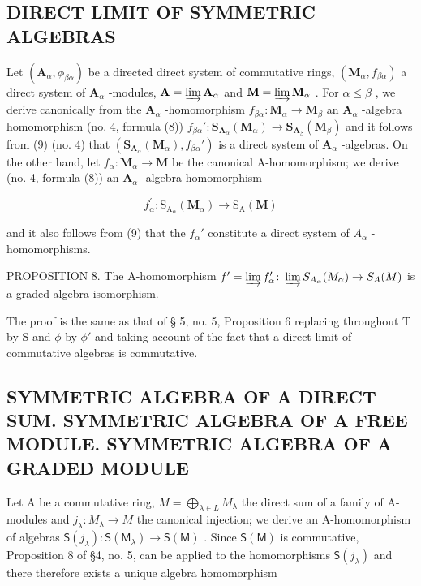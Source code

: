 \subsection{DIRECT LIMIT OF SYMMETRIC ALGEBRAS}

Let \((\mathbf{A}_{\alpha},\phi_{\beta \alpha})\) be a directed direct system of commutative rings, \((\mathbf{M}_{\alpha},f_{\beta \alpha})\) a direct system of \(\mathbf{A}_{\alpha}\) -modules, \(\mathbf{A} = \varinjlim \mathbf{A}_{\alpha}\) and \(\mathbf{M} = \varinjlim \mathbf{M}_{\alpha}\) . For \(\alpha \leqslant \beta\) , we derive canonically from the \(\mathbf{A}_{\alpha}\) -homomorphism \(f_{\beta \alpha}: \mathbf{M}_{\alpha} \to \mathbf{M}_{\beta}\) an \(\mathbf{A}_{\alpha}\) -algebra homomorphism (no. 4, formula (8)) \(f_{\beta \alpha}': \mathbf{S}_{\mathbf{A}_{\alpha}}(\mathbf{M}_{\alpha}) \to \mathbf{S}_{\mathbf{A}_{\beta}}(\mathbf{M}_{\beta})\) and it follows from (9) (no. 4) that \((\mathbf{S}_{\mathbf{A}_{\alpha}}(\mathbf{M}_{\alpha}), f_{\beta \alpha}')\) is a direct system of \(\mathbf{A}_{\alpha}\) -algebras. On the other hand, let \(f_{\alpha}: \mathbf{M}_{\alpha} \to \mathbf{M}\) be the canonical A-homomorphism; we derive (no. 4, formula (8)) an \(\mathbf{A}_{\alpha}\) -algebra homomorphism

\[
f _ {\alpha} ^ {\prime}: \mathrm{S} _ {\mathrm{A} _ {\alpha}} (\mathbf {M} _ {\alpha}) \rightarrow \mathrm{S} _ {\mathrm{A}} (\mathbf {M})
\]

and it also follows from (9) that the \(f_{\alpha}'\) constitute a direct system of \(A_{\alpha}\) -homomorphisms.

PROPOSITION 8. The A-homomorphism \(f' = \varinjlim f_{\alpha}' \colon \varinjlim S_{A_{\alpha}}(M_{\alpha}) \to S_{A}(M)\) is a graded algebra isomorphism.

The proof is the same as that of § 5, no. 5, Proposition 6 replacing throughout T by S and \(\phi\) by \(\phi'\) and taking account of the fact that a direct limit of commutative algebras is commutative.

\subsection{SYMMETRIC ALGEBRA OF A DIRECT SUM. SYMMETRIC ALGEBRA OF A FREE MODULE. SYMMETRIC ALGEBRA OF A GRADED MODULE}

Let A be a commutative ring, \(M = \bigoplus_{\lambda \in L} M_{\lambda}\) the direct sum of a family of A-modules and \(j_{\lambda}: M_{\lambda} \to M\) the canonical injection; we derive an A-homomorphism of algebras \(\mathsf{S}(j_{\lambda}): \mathsf{S}(\mathsf{M}_{\lambda}) \to \mathsf{S}(\mathsf{M})\) . Since \(\mathsf{S}(\mathsf{M})\) is commutative, Proposition 8 of §4, no. 5, can be applied to the homomorphisms \(\mathsf{S}(j_{\lambda})\) and there therefore exists a unique algebra homomorphism

